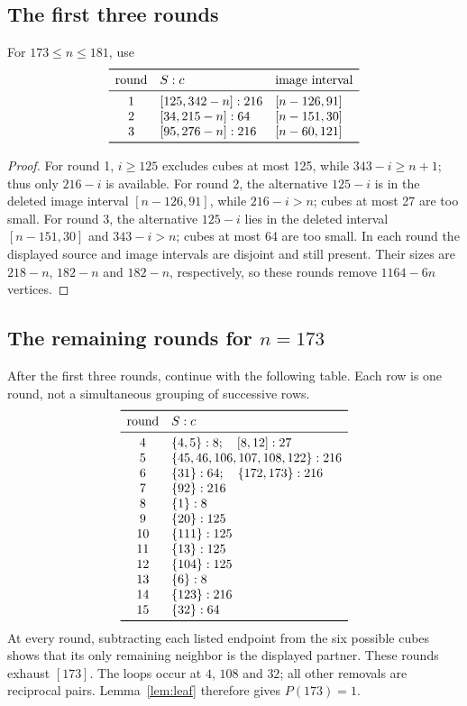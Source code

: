 \subsection{The first three rounds}
For $173\le n\le181$, use
\[
\begin{array}{cll}\toprule
\text{round}&S:c&\text{image interval}\\\midrule
1 &[125,342-n]:216 &[n-126,91]\\
2 &[34,215-n]:64 &[n-151,30]\\
3 &[95,276-n]:216 &[n-60,121]\\\bottomrule
\end{array}
\]
\begin{proof}
For round 1, $i\ge125$ excludes cubes at most 125, while
$343-i\ge n+1$; thus only $216-i$ is available.
For round 2, the alternative $125-i$ is in the deleted image interval
$[n-126,91]$, while $216-i>n$; cubes at most 27 are too small.
For round 3, the alternative $125-i$ lies in the deleted interval
$[n-151,30]$ and $343-i>n$; cubes at most 64 are too small.
In each round the displayed source and image intervals are disjoint
and still present. Their sizes are $218-n$, $182-n$ and $182-n$,
respectively, so these rounds remove $1164-6n$ vertices.
\end{proof}

\subsection{The remaining rounds for \texorpdfstring{$n=173$}{n=173}}
After the first three rounds, continue with the following table.
Each row is one round, not a simultaneous grouping of successive rows.
\[
\begin{array}{cl}\toprule
\text{round}&S:c\\\midrule
4 &\{4,5\}:8;\quad [8,12]:27\\
5 &\{45,46,106,107,108,122\}:216\\
6 &\{31\}:64;\quad\{172,173\}:216\\
7 &\{92\}:216\\
8 &\{1\}:8\\
9 &\{20\}:125\\
10&\{111\}:125\\
11&\{13\}:125\\
12&\{104\}:125\\
13&\{6\}:8\\
14&\{123\}:216\\
15&\{32\}:64\\\bottomrule
\end{array}
\]
At every round, subtracting each listed endpoint from the six possible
cubes shows that its only remaining neighbor is the displayed partner.
These rounds exhaust $[173]$. The loops occur at $4$, $108$ and $32$;
all other removals are reciprocal pairs. Lemma~\ref{lem:leaf} therefore
gives $P(173)=1$.

